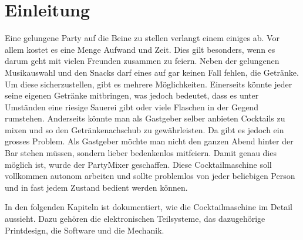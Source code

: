 \clearpage
\section{Einleitung}
\label{sec:Einleitung}

Eine gelungene Party auf die Beine zu stellen verlangt einem einiges ab. Vor allem kostet es eine Menge Aufwand und Zeit. Dies gilt besonders, wenn es darum geht mit vielen Freunden zusammen zu feiern. Neben der gelungenen Musikauswahl und den Snacks darf eines auf gar keinen Fall fehlen, die Getränke. Um diese sicherzustellen, gibt es mehrere Möglichkeiten. Einerseits könnte jeder seine eigenen Getränke mitbringen, was jedoch bedeutet, dass es unter Umständen eine riesige Sauerei gibt oder viele Flaschen in der Gegend rumstehen. Anderseits könnte man als Gastgeber selber anbieten Cocktails zu mixen und so den Getränkenachschub zu gewährleisten. Da gibt es jedoch ein grosses Problem. Als Gastgeber möchte man nicht den ganzen Abend hinter der Bar stehen müssen, sondern lieber bedenkenlos mitfeiern. Damit genau dies möglich ist, wurde der PartyMixer geschaffen. Diese Cocktailmaschine soll vollkommen autonom arbeiten und sollte problemlos von jeder beliebigen Person und in fast jedem Zustand bedient werden können. 

In den folgenden Kapiteln ist dokumentiert, wie die Cocktailmaschine im Detail aussieht. Dazu gehören die elektronischen Teilsysteme, das dazugehörige Printdesign, die Software und die Mechanik.